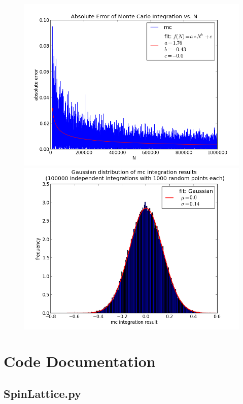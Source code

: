 \documentclass[12pt,a4paper,titlepage]{article}
\begin{document}
\begin{appendix}
\begin{figure}
\begin{minipage}[b]{\linewidth}
		\centering
		\includegraphics[width=\linewidth]{Plots/sin}
	\end{minipage}
	\begin{minipage}[b]{\linewidth}
		\centering
		\includegraphics[width=\linewidth]{Plots/sin_hist}
	\end{minipage}
	\label{fig:linear}
\end{figure}


\section*{Code Documentation}
\subsection*{SpinLattice.py}

\end{appendix}
\end{document}
